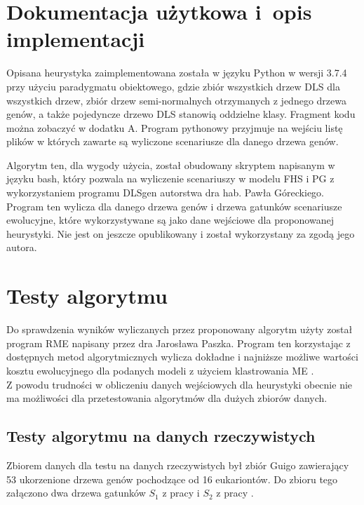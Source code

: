\documentclass[licencjacka]{pracamgr}
\begin{document}
\section{Dokumentacja użytkowa i~opis implementacji}\label{r:impl}
Opisana heurystyka zaimplementowana została w języku Python w wersji 3.7.4 przy użyciu paradygmatu obiektowego, gdzie zbiór wszystkich drzew DLS dla wszystkich drzew, zbiór drzew semi-normalnych otrzymanych z jednego drzewa genów, a także pojedyncze drzewo DLS stanowią oddzielne klasy. Fragment kodu można zobaczyć w dodatku A. Program pythonowy przyjmuje na wejściu listę plików w których zawarte są wyliczone scenariusze dla danego drzewa genów.

Algorytm ten, dla wygody użycia, został obudowany skryptem napisanym w języku bash, który pozwala na wyliczenie scenariuszy w modelu FHS i PG z wykorzystaniem programu DLSgen autorstwa dra hab. Pawła Góreckiego. Program ten wylicza dla danego drzewa genów i drzewa gatunków scenariusze ewolucyjne, które wykorzystywane są jako dane wejściowe dla proponowanej heurystyki. Nie jest on jeszcze opublikowany i został wykorzystany za zgodą jego autora.


\section{Testy algorytmu}
Do sprawdzenia wyników wyliczanych przez proponowany algorytm użyty został program RME napisany przez dra Jarosława Paszka. Program ten korzystając z dostępnych metod algorytmicznych wylicza dokładne i najniższe możliwe wartości kosztu ewolucyjnego dla podanych modeli z użyciem klastrowania ME \cite{RME}.
\\
Z powodu trudności w obliczeniu danych wejściowych dla heurystyki obecnie nie ma możliwości dla przetestowania algorytmów dla dużych zbiorów danych.

\subsection{Testy algorytmu na danych rzeczywistych}
Zbiorem danych dla testu na danych rzeczywistych był zbiór Guigo zawierający 53 ukorzenione drzewa genów pochodzące od 16 eukariontów. Do zbioru tego załączono dwa drzewa gatunków $S_1$ z pracy \cite{Guigo1996} i $S_2$ z pracy \cite{Page1997RTI}. 
\end{document}
